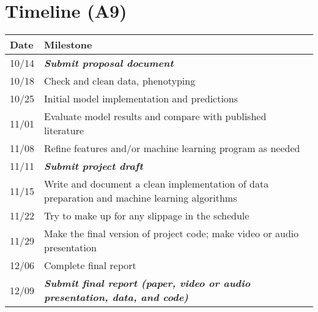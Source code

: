 \documentclass{amia}
\begin{document}
\section*{Timeline (A9)}
         \begin{table}[H]
         \begin{tabular}{ll}
         \toprule
         Date & Milestone\\
         \midrule
	 10/14 & \textbf{\emph{Submit proposal document}}\\
	 10/18 & Check and clean data, phenotyping\\
	 10/25 & Initial model implementation and predictions\\
	 11/01 & Evaluate model results and compare with published literature\\
	 11/08 & Refine features and/or machine learning program as needed\\
	 11/11 & \textbf{\emph{Submit project draft}}\\
	 11/15 & Write and document a clean implementation of data preparation and machine learning algorithms\\
	 11/22 & Try to make up for any slippage in the schedule\\
	 11/29 & Make the final version of project code; make video or audio presentation\\
	 12/06 & Complete final report\\
	 12/09 & \textbf{\emph{Submit final report (paper, video or audio presentation, data, and code)}}\\
         \bottomrule
         \end{tabular}
         \end{table}
	
\end{document}
